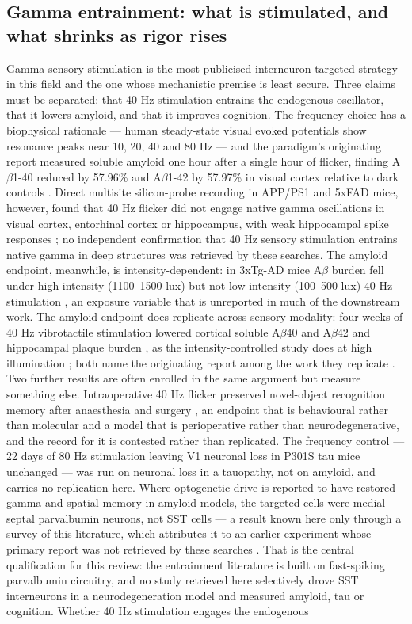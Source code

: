 \documentclass[11pt]{article}
\begin{document}
\subsection{Gamma entrainment: what is stimulated, and what shrinks as rigor rises}
\label{sec-10-gamma}

Gamma sensory stimulation is the most publicised interneuron-targeted strategy in this field and the one whose mechanistic premise is least secure. Three claims must be separated: that 40 Hz stimulation entrains the endogenous oscillator, that it lowers amyloid, and that it improves cognition. The frequency choice has a biophysical rationale --- human steady-state visual evoked potentials show resonance peaks near 10, 20, 40 and 80 Hz \citep{Herrmann2001} --- and the paradigm's originating report measured soluble amyloid one hour after a single hour of flicker, finding A$\beta$1-40 reduced by 57.96\% and A$\beta$1-42 by 57.97\% in visual cortex relative to dark controls \citep{Iaccarino2016}. Direct multisite silicon-probe recording in APP/PS1 and 5xFAD mice, however, found that 40 Hz flicker did not engage native gamma oscillations in visual cortex, entorhinal cortex or hippocampus, with weak hippocampal spike responses \citep{Soula2023}; no independent confirmation that 40 Hz sensory stimulation entrains native gamma in deep structures was retrieved by these searches. The amyloid endpoint, meanwhile, is intensity-dependent: in 3xTg-AD mice A$\beta$ burden fell under high-intensity (1100--1500 lux) but not low-intensity (100--500 lux) 40 Hz stimulation \citep{Gu2026}, an exposure variable that is unreported in much of the downstream work. The amyloid endpoint does replicate across sensory modality: four weeks of 40 Hz vibrotactile stimulation lowered cortical soluble A$\beta$40 and A$\beta$42 and hippocampal plaque burden \citep{Nam2026}, as the intensity-controlled study does at high illumination \citep{Gu2026}; both name the originating report among the work they replicate \citep{Iaccarino2016}. Two further results are often enrolled in the same argument but measure something else. Intraoperative 40 Hz flicker preserved novel-object recognition memory after anaesthesia and surgery \citep{Jiang2026}, an endpoint that is behavioural rather than molecular and a model that is perioperative rather than neurodegenerative, and the record for it is contested rather than replicated. The frequency control --- 22 days of 80 Hz stimulation leaving V1 neuronal loss in P301S tau mice unchanged \citep{Adaikkan2019} --- was run on neuronal loss in a tauopathy, not on amyloid, and carries no replication here. Where optogenetic drive is reported to have restored gamma and spatial memory in amyloid models, the targeted cells were medial septal parvalbumin neurons, not SST cells --- a result known here only through a survey of this literature, which attributes it to an earlier experiment whose primary report was not retrieved by these searches \citep{Zhang2024a}. That is the central qualification for this review: the entrainment literature is built on fast-spiking parvalbumin circuitry, and no study retrieved here selectively drove SST interneurons in a neurodegeneration model and measured amyloid, tau or cognition. Whether 40 Hz stimulation engages the endogenous 
\end{document}
